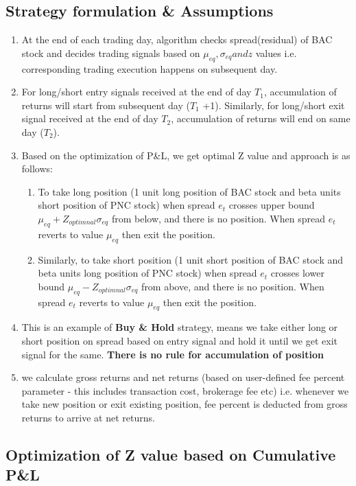 \documentclass[a4paper, 11pt]{article}
\begin{document}
\subsection{Strategy formulation \& Assumptions}

\begin{enumerate}

\item At the end of each trading day, algorithm checks spread(residual) of BAC stock and decides trading 	signals based on $ \mu_{eq}, \sigma_{eq} and z $ values i.e. corresponding trading execution happens on subsequent day.
\item For long/short entry signals received at the end of day $T_1$, accumulation of returns will start from subsequent day ($T_1$ +1). Similarly, for long/short exit signal received at the end of day $T_2$, accumulation of returns will end on same day ($T_2$).
\item  Based on the optimization of P\&L, we get optimal Z value and approach is as follows:
\begin{enumerate}
\item To take long position (1 unit long position of BAC stock and beta units short position of PNC stock) when
spread $e_t$ crosses upper bound $\mu_{eq} + Z_{optimnal} \sigma_{eq} $ from below, and there is no position.
When spread $e_t$ reverts to value $\mu_{eq}$ then exit the position.
\item Similarly, to take short position (1 unit short position of BAC stock and beta units long position of PNC stock) when spread $e_t$ crosses lower bound $\mu_{eq} - Z_{optimnal} \sigma_{eq} $ from above, and there is no position. When spread $e_t$ reverts to value $\mu_{eq}$ then exit the position.
\end{enumerate}
\item This is an example of \textbf{Buy \& Hold} strategy, means we take either long or short position on spread based on entry signal and hold it until we get exit signal for the same. \textbf{There is no rule for accumulation of position}
\item we calculate gross returns and net returns (based on user-defined fee percent parameter - this includes transaction cost, brokerage fee etc) i.e. whenever we take new position or exit existing position, fee percent is deducted from gross returns to arrive at net returns.

\end{enumerate}

\subsection{Optimization of Z  value based on Cumulative P\&L }
\end{document}
